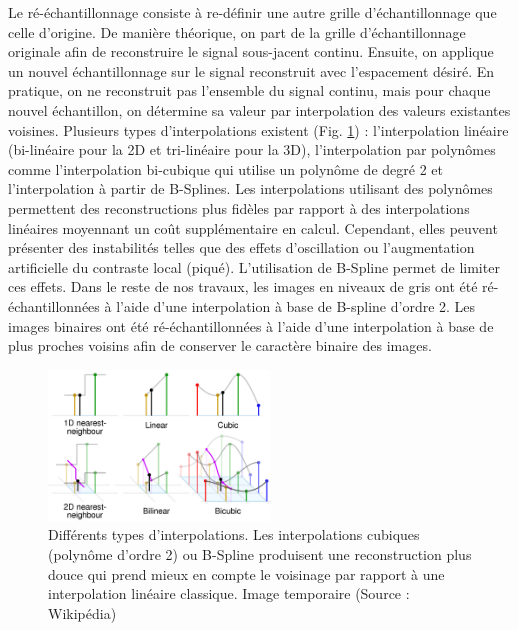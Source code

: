 Le ré-échantillonnage consiste à re-définir une autre grille d'échantillonnage que celle d'origine. De manière théorique, on part de la grille d'échantillonnage originale afin de reconstruire le signal sous-jacent continu. Ensuite, on applique un nouvel échantillonnage sur le signal reconstruit avec l'espacement désiré. En pratique, on ne reconstruit pas l'ensemble du signal continu, mais pour chaque nouvel échantillon, on détermine sa valeur par interpolation des valeurs existantes voisines. Plusieurs types d'interpolations existent (Fig. \ref{fig:interpolation}) : l'interpolation linéaire (bi-linéaire pour la 2D et tri-linéaire pour la 3D), l'interpolation par polynômes comme l'interpolation bi-cubique qui utilise un polynôme de degré 2 et l'interpolation à partir de B-Splines. Les interpolations utilisant des polynômes permettent des reconstructions plus fidèles par rapport à des interpolations linéaires moyennant un coût supplémentaire en calcul. Cependant, elles peuvent présenter des instabilités telles que des effets d'oscillation ou l'augmentation artificielle du contraste local (piqué). L'utilisation de B-Spline permet de limiter ces effets. Dans le reste de nos travaux, les images en niveaux de gris ont été ré-échantillonnées à l'aide d'une interpolation à base de B-spline d'ordre 2. Les images binaires ont été ré-échantillonnées à l'aide d'une interpolation à base de plus proches voisins afin de conserver le caractère binaire des images.


\begin{figure}[!ht]
  \centering
  \includegraphics[height=4cm]{Images/Interpolation.png}
  \caption{Différents types d'interpolations. Les interpolations cubiques (polynôme d'ordre 2) ou B-Spline produisent une reconstruction plus douce qui prend mieux en compte le voisinage par rapport à une interpolation linéaire classique. Image temporaire (Source : Wikipédia)}
  \label{fig:interpolation}
\end{figure}

